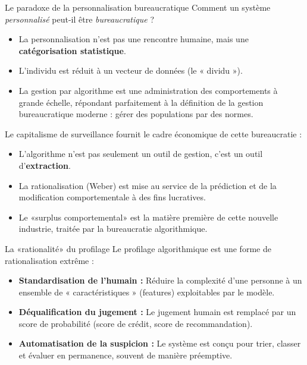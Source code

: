 \documentclass[9pt, aspectratio=169]{beamer}
\begin{document}
\begin{frame}{Le paradoxe de la personnalisation bureaucratique}
    Comment un système \textit{personnalisé} peut-il être \textit{bureaucratique} ?
    \begin{itemize}
        \item La personnalisation n'est pas une rencontre humaine, mais une \textbf{catégorisation statistique}.
        \item L'individu est réduit à un vecteur de données (le « dividu »).
        \item La gestion par algorithme est une administration des comportements à grande échelle, répondant parfaitement à la définition de la gestion bureaucratique moderne : gérer des populations par des normes.
    \end{itemize}
\end{frame}

\begin{frame}{Le capitalisme de surveillance}
    \cite{Zuboff2019} fournit le cadre économique de cette bureaucratie :
    \begin{itemize}
        \item L'algorithme n'est pas seulement un outil de gestion, c'est un outil d'\textbf{extraction}.
        \item La rationalisation (Weber) est mise au service de la prédiction et de la modification comportementale à des fins lucratives.
        \item Le «surplus comportemental» est la matière première de cette nouvelle industrie, traitée par la bureaucratie algorithmique.
    \end{itemize}
\end{frame}

\begin{frame}{La «rationalité» du profilage}
    Le profilage algorithmique est une forme de rationalisation extrême :
    \begin{itemize}
        \item \textbf{Standardisation de l'humain :} Réduire la complexité d'une personne à un ensemble de « caractéristiques » (features) exploitables par le modèle.
        \item \textbf{Déqualification du jugement :} Le jugement humain est remplacé par un score de probabilité (score de crédit, score de recommandation).
        \item \textbf{Automatisation de la suspicion :} Le système est conçu pour trier, classer et évaluer en permanence, souvent de manière préemptive.
    \end{itemize}
\end{frame}
\end{document}
